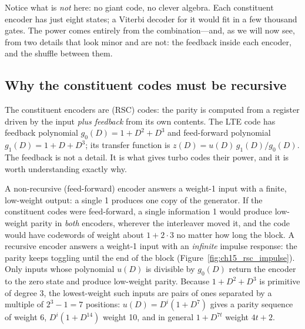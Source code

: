 Notice what is \emph{not} here: no giant code, no clever algebra. Each constituent encoder has
just eight states; a Viterbi decoder for it would fit in a few thousand gates. The power comes
entirely from the combination---and, as we will now see, from two details that look minor and are
not: the feedback inside each encoder, and the shuffle between them.

\subsection{Why the constituent codes must be recursive}

The constituent encoders are  (RSC) codes: the parity is
computed from a register driven by the input \emph{plus feedback} from its own contents. The LTE
code has feedback polynomial $g_0(D)=1+D^2+D^3$ and feed-forward polynomial $g_1(D)=1+D+D^3$; its
transfer function is $z(D)=u(D)\,g_1(D)/g_0(D)$. The feedback is not a detail. It is what gives
turbo codes their power, and it is worth understanding exactly why.


A non-recursive (feed-forward) encoder answers a weight-1 input with a finite, low-weight output:
a single 1 produces one copy of the generator. If the constituent codes were feed-forward, a single
information 1 would produce low-weight parity in \emph{both} encoders, wherever the interleaver
moved it, and the code would have codewords of weight about $1+2\cdot 3$ no matter how long the
block. A recursive encoder answers a weight-1 input with an \emph{infinite} impulse response: the
parity keeps toggling until the end of the block (Figure~\ref{fig:ch15_rsc_impulse}). Only inputs
whose polynomial $u(D)$ is divisible by $g_0(D)$ return the encoder to the zero state and produce
low-weight parity. Because $1+D^2+D^3$ is primitive of degree 3, the lowest-weight such inputs are
pairs of ones separated by a multiple of $2^3-1=7$ positions: $u(D)=D^i(1+D^7)$ gives a parity
sequence of weight 6, $D^i(1+D^{14})$ weight 10, and in general $1+D^{7t}$ weight $4t+2$.

